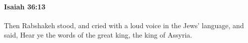 
		\paragraph{Isaiah 36:13} %
			\label{ISAIAH-36-13}

			Then Rabshakeh stood, and cried with a loud voice in the Jews' language, and said, Hear ye the words of the great king, the king of Assyria.


